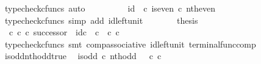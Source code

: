 \begin{isabellebody}
\ {\isacharparenleft}{\kern0pt}typecheck{\isacharunderscore}{\kern0pt}cfuncs{\isacharcomma}{\kern0pt}\ auto{\isacharparenright}{\kern0pt}\isanewline
\ \ \ \ \isamarkupfalse%
\ \isamarkupfalse%
\ {\isachardoublequoteopen}{\isachardot}{\kern0pt}{\isachardot}{\kern0pt}{\isachardot}{\kern0pt}\ {\isacharequal}{\kern0pt}\ id\ {\isasymOmega}\ {\isasymcirc}\isactrlsub c\ is{\isacharunderscore}{\kern0pt}even\ {\isasymcirc}\isactrlsub c\ nth{\isacharunderscore}{\kern0pt}even{\isachardoublequoteclose}\isanewline
\ \ \ \ \ \ \isamarkupfalse%
\ {\isacharparenleft}{\kern0pt}typecheck{\isacharunderscore}{\kern0pt}cfuncs{\isacharcomma}{\kern0pt}\ simp\ add{\isacharcolon}{\kern0pt}\ id{\isacharunderscore}{\kern0pt}left{\isacharunderscore}{\kern0pt}unit{}{\isacharparenright}{\kern0pt}\isanewline
\ \ \ \ \isamarkupfalse%
\ \isamarkupfalse%
\ {\isacharquery}{\kern0pt}thesis\isacommand{{\isachardot}{\kern0pt}}\isamarkupfalse%
\isanewline
\ \ \isamarkupfalse%
\isanewline
\isanewline
\ \ \isamarkupfalse%
\ {\isachardoublequoteopen}{\isacharparenleft}{\kern0pt}{\isasymt}\ {\isasymcirc}\isactrlsub c\ {\isasymbeta}\isactrlbsub {\isasymnat}\isactrlsub c\isactrlesub {\isacharparenright}{\kern0pt}\ {\isasymcirc}\isactrlsub c\ successor\ {\isacharequal}{\kern0pt}\ id\isactrlsub c\ {\isasymOmega}\ {\isasymcirc}\isactrlsub c\ {\isasymt}\ {\isasymcirc}\isactrlsub c\ {\isasymbeta}\isactrlbsub {\isasymnat}\isactrlsub c\isactrlesub {\isachardoublequoteclose}\isanewline
\ \ \ \ \isamarkupfalse%
\ {\isacharparenleft}{\kern0pt}typecheck{\isacharunderscore}{\kern0pt}cfuncs{\isacharcomma}{\kern0pt}\ smt\ comp{\isacharunderscore}{\kern0pt}associative{}\ id{\isacharunderscore}{\kern0pt}left{\isacharunderscore}{\kern0pt}unit{}\ terminal{\isacharunderscore}{\kern0pt}func{\isacharunderscore}{\kern0pt}comp{\isacharparenright}{\kern0pt}\isanewline
{}\isamarkupfalse%
%
\endisatagproof
{\isafoldproof}%
%
\isadelimproof
\isanewline
%
\endisadelimproof
\isanewline
{}\isamarkupfalse%
\ is{\isacharunderscore}{\kern0pt}odd{\isacharunderscore}{\kern0pt}nth{\isacharunderscore}{\kern0pt}odd{\isacharunderscore}{\kern0pt}true{\isacharcolon}{\kern0pt}\isanewline
\ \ {\isachardoublequoteopen}is{\isacharunderscore}{\kern0pt}odd\ {\isasymcirc}\isactrlsub c\ nth{\isacharunderscore}{\kern0pt}odd\ {\isacharequal}{\kern0pt}\ {\isasymt}\ {\isasymcirc}\isactrlsub c\ {\isasymbeta}\isactrlbsub {\isasymnat}\isactrlsub c\isactrlesub {\isachardoublequoteclose}\isanewline

\end{isabellebody}
